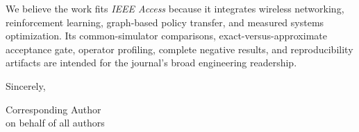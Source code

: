 \documentclass{article}
\begin{document}
We believe the work fits \emph{IEEE Access} because it integrates wireless networking, reinforcement learning, graph-based policy transfer, and measured systems optimization. Its common-simulator comparisons, exact-versus-approximate acceptance gate, operator profiling, complete negative results, and reproducibility artifacts are intended for the journal's broad engineering readership.

Sincerely,

\vspace{2em}
Corresponding Author\\
on behalf of all authors
\end{document}
